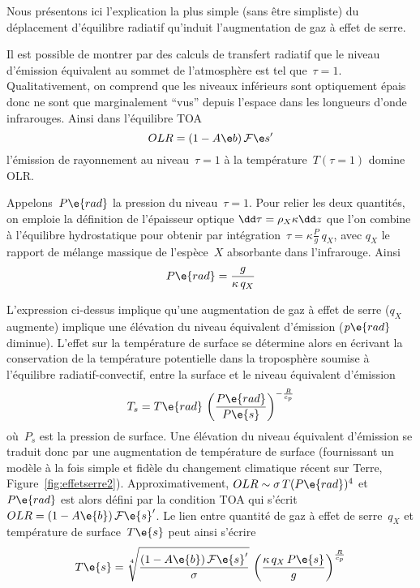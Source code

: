 



\sk
Nous présentons ici l'explication la plus simple (sans être simpliste) du déplacement
d'équilibre radiatif qu'induit l'augmentation de gaz à effet de serre.

\sk
Il est possible de montrer par des calculs de transfert radiatif que le niveau
d'émission équivalent au sommet de l'atmosphère est tel que~$\tau = 1$.
Qualitativement, on comprend que les niveaux inférieurs sont optiquement
épais donc ne sont que marginalement ``vus'' depuis l'espace dans les longueurs d'onde infrarouges.
Ainsi dans l'équilibre TOA
\[ \TOA \] 
\noindent l'émission de rayonnement au niveau~$\tau=1$ 
à la température~$T(\tau=1)$ domine OLR.

\sk
Appelons~$P\e{rad}$ la pression du niveau~$\tau=1$. 
Pour relier
les deux quantités, on emploie la définition de l'épaisseur optique
$\EO$ que l'on combine
à l'équilibre hydrostatique pour obtenir
par intégration~$\tau = \kappa \frac{P}{g} \, q_X$,
avec $q_X$ le rapport de mélange massique 
de l'espèce~$X$ absorbante dans l'infrarouge.
Ainsi
\[ P\e{rad} = \frac{g}{\kappa \, q_X} \]


\sk
L'expression ci-dessus implique qu'une augmentation de
gaz à effet de serre ($q_X$ augmente) implique une 
élévation du niveau équivalent d'émission
($p\e{rad}$ diminue).
L'effet sur la température de surface se détermine alors
en écrivant la conservation de la température potentielle
dans la troposphère soumise à l'équilibre radiatif-convectif,
entre la surface et le niveau équivalent d'émission
\[ T_s = T\e{rad} \, \left( \frac{P\e{rad}}{P\e{s}} \right)^{-\frac{R}{c_p}} \]
\noindent où~$P_s$ est la pression de surface.
Une élévation du niveau équivalent d'émission
se traduit donc par une augmentation
de température de surface (fournissant
un modèle à la fois simple et fidèle du 
changement climatique récent sur Terre, Figure~\ref{fig:effetserre2}). 
Approximativement, $OLR \sim \sigma \, T(P\e{rad})^4$
et~$P\e{rad}$ est alors défini par la 
condition TOA qui s'écrit~$OLR = (1-A\e{b}) \, \mathcal{F}\e{s}'$.
Le lien entre quantité de gaz à effet de serre~$q_X$
et température de surface~$T\e{s}$ peut ainsi s'écrire
\[ T\e{s} = \sqrt[4]{\frac{(1-A\e{b}) \, \mathcal{F}\e{s}'}{\sigma}} \, \left( \frac{\kappa \, q_X \,P\e{s}}{g} \right)^{\frac{R}{c_p}} \]
